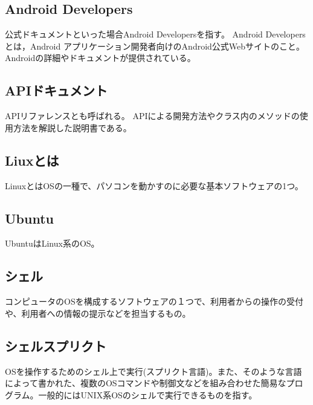 \subsection{Android Developers}
公式ドキュメントといった場合Android Developersを指す。
Android Developers とは，Android アプリケーション開発者向けのAndroid公式Webサイトのこと。Androidの詳細やドキュメントが提供されている。

\subsection{APIドキュメント}
APIリファレンスとも呼ばれる。
APIによる開発方法やクラス内のメソッドの使用方法を解説した説明書である。

\subsection{Liuxとは}
LinuxとはOSの一種で、パソコンを動かすのに必要な基本ソフトウェアの1つ。

\subsection{Ubuntu}
UbuntuはLinux系のOS。

\subsection{シェル}
コンピュータのOSを構成するソフトウェアの１つで、利用者からの操作の受付や、利用者への情報の提示などを担当するもの。

\subsection{シェルスプリクト}
OSを操作するためのシェル上で実行(スプリクト言語)。また、そのような言語によって書かれた、複数のOSコマンドや制御文などを組み合わせた簡易なプログラム。一般的にはUNIX系OSのシェルで実行できるものを指す。



























